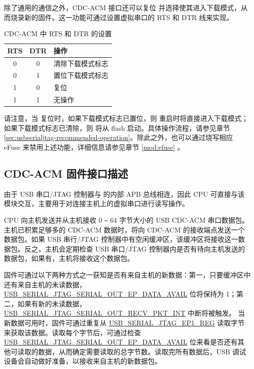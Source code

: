 \documentclass[main\_\_CN.tex]{subfiles}
\begin{document}
除了通用的通信之外，CDC-ACM 接口还可以复位 \chipname{} 并选择使其进入下载模式，从而烧录新的固件。这一功能可通过设置虚拟串口的 RTS 和 DTR 线来实现。

\begin{table}[H] 
    \centering
    \caption{CDC-ACM 中 RTS 和 DTR 的设置}
    \label{tab:usbserialjtag-cdc-acm-settings-with-rts-and-dtr}
    
    \begin{tabular}{ | c | c | p{5cm} | }
    \hline
        \rowcolor{lightgray}
        \textbf{RTS} & \textbf{DTR} & \textbf{操作}\\\hline
        
        0 & 0 & 清除下载模式标志 \\\hline
        0 & 1 & 置位下载模式标志  \\\hline
        1 & 0 & 复位 \chipname{}  \\\hline
        1 & 1 & 无操作 \\\hline
    \end{tabular}
\end{table}

请注意，当 \chipname{} 复位时，如果下载模式标志已置位，则 \chipname{} 重启时将直接进入下载模式；如果下载模式标志已清除，则 \chipname{} 将从 flash 启动。具体操作流程，请参见章节 \ref{sec:usbserialjtag-recommended-operation}。除此之外，也可以通过烧写相应 eFuse 来禁用上述功能，详细信息请参见章节 \ref{mod:efuse} \textit{}。

\subsection{CDC-ACM 固件接口描述}

由于 USB 串口/JTAG 控制器与 \chipname{} 的内部 APB 总线相连，因此 CPU 可直接与该模块交互，主要用于对连接主机上的虚拟串口进行读写操作。

CPU 向主机发送并从主机接收 0 \verb+~+ 64 字节大小的 USB CDC-ACM 串口数据包。主机已积累足够多的 CDC-ACM 数据时，将向 CDC-ACM 的接收端点发送一个数据包。如果 USB 串行/JTAG 控制器中有空闲缓冲区，该缓冲区将接收这一数据包。反之，主机会定期检查 USB 串口/JTAG 控制器内是否有待向主机发送的数据包，如果有，主机将接收这个数据包。

固件可通过以下两种方式之一获知是否有来自主机的新数据：第一，只要缓冲区中还有来自主机的未读数据，\hyperref[fielddesc:USBSERIALJTAGSERIALOUTEPDATAAVAIL]{USB\_SERIAL\_JTAG\_SERIAL\_OUT\_EP\_DATA\_AVAIL} 位将保持为 1；第二，如果有新的未读数据，\\\hyperref[fielddesc:USBSERIALJTAGSERIALOUTRECVPKTINTRAW]{USB\_SERIAL\_JTAG\_SERIAL\_OUT\_RECV\_PKT\_INT} 中断将被触发。 当新数据可用时，固件可通过重复从 \hyperref[fielddesc:USBSERIALJTAGRDWRBYTE]{USB\_SERIAL\_JTAG\_EP1\_REG} 读取字节来获取该数据。读取每个字节后，可通过检查 \hyperref[fielddesc:USBSERIALJTAGSERIALOUTEPDATAAVAIL]{USB\_SERIAL\_JTAG\_SERIAL\_OUT\_EP\_DATA\_AVAIL} 位来看是否还有其他可读取的数据，从而确定需要读取的总字节数。读取完所有数据后，USB 调试设备会自动做好准备，以接收来自主机的新数据包。
\end{document}
